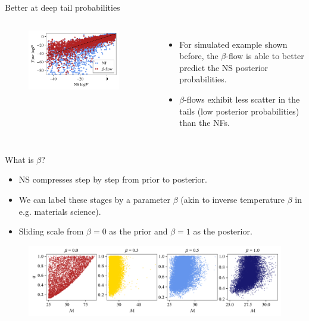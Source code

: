 \documentclass[aspectratio=169]{beamer}
\begin{document}
\begin{frame}{Better at deep tail probabilities}
    \begin{columns}
        \vspace{3em}
        \begin{figure}
            \centering
            \includegraphics[width=0.9\textwidth]{Ca_Foscari Beamer/presentation_NF_vs_betaflow_simulated.pdf}
        \end{figure}
    \begin{itemize}
        \item For simulated example shown before, the $\beta$-flow is able to better predict the NS posterior probabilities.
        \item $\beta$-flows exhibit less scatter in the tails (low posterior probabilities) than the NFs.
    \end{itemize}
    \end{columns}
\end{frame}

\begin{frame}{What is $\beta$?}
\begin{itemize}\vspace{2em}
    \item NS compresses step by step from prior to posterior.
    \item We can label these stages by a parameter $\beta$ (akin to inverse temperature $\beta$ in e.g. materials science). 
    \item Sliding scale from $\beta = 0$ as the prior and $\beta = 1$ as the posterior.
\end{itemize}
\begin{figure}
    \centering
    \includegraphics[width=0.9\linewidth]{Ca_Foscari Beamer/presentation_beta.pdf}
\end{figure}

\end{frame}
\end{document}
